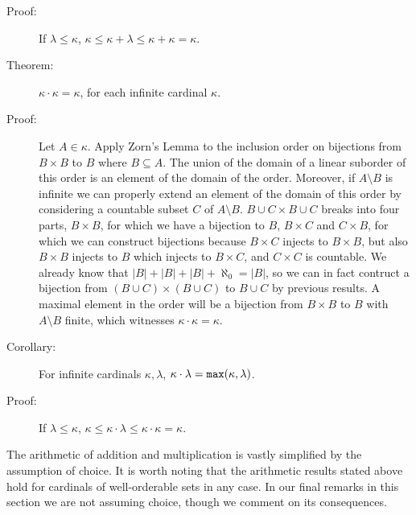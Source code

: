 \documentclass[12pt]{article}
\begin{document}
\begin{description}
\item[Proof:]  If $\lambda\leq \kappa$, $\kappa \leq \kappa+\lambda \leq \kappa+\kappa = \kappa$.


\item[Theorem:]  $\kappa \cdot \kappa = \kappa$, for each infinite cardinal $\kappa$.

\item[Proof:]  Let $A \in \kappa$.  Apply Zorn's Lemma to the inclusion order on bijections from $B \times B$ to $B$ where $B \subseteq A$.  The union of the domain of a linear suborder of this order is an element of the domain of the order.  Moreover, if $A \setminus B$ is infinite we can properly extend an element of the domain of this order by considering a countable subset $C$
of $A \setminus B$.  $B \cup C \times B \cup C$ breaks into four parts, $B \times B$, for which we have a bijection to $B$, $B \times C$ and $C \times B$, for which we can construct bijections because $B \times C$ injects to $B \times B$, but also $B \times B$ injects to $B$ which injects to $B \times C$, and $C \times C$ is countable.  We already know
that $|B|+|B|+|B|+ \aleph_0 = |B|$, so we can in fact contruct a bijection from $(B \cup C) \times (B \cup C)$ to $B \cup C$ by previous results.  A maximal element in the order will be a bijection from $B \times B$ to $B$ with $A \setminus B$ finite, which witnesses $\kappa \cdot\kappa = \kappa$.

\item[Corollary:]  For infinite cardinals $\kappa, \lambda$, $\kappa\cdot\lambda={\tt max}(\kappa,\lambda)$.

\item[Proof:]  If $\lambda\leq \kappa$, $\kappa \leq \kappa\cdot\lambda \leq \kappa\cdot\kappa = \kappa$.

\end{description}

The arithmetic of addition and multiplication is vastly simplified by the assumption of choice.  It is worth noting that the arithmetic results stated above hold for cardinals of well-orderable sets in any case.  In our final remarks in this section we are not assuming choice, though we comment on its consequences.
\end{document}
